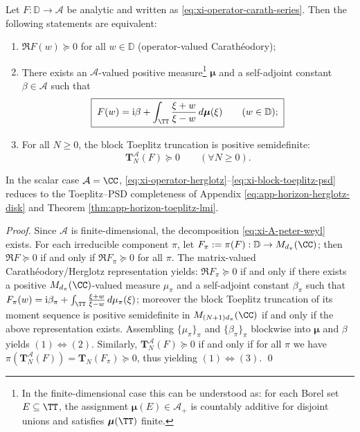 \begin{theorem}\label{thm:xi-operator-herglotz-toeplitz-completeness}
Let \(F:\mathbb{D}\to\mathcal{A}\) be analytic and written as \eqref{eq:xi-operator-carath-series}.
Then the following statements are equivalent:
\begin{enumerate}
  \item \(\Re F(w)\succeq 0\) for all \(w\in\mathbb{D}\) (operator-valued Carath\'eodory);
  \item There exists an \(\mathcal{A}\)-valued positive measure\footnote{In the finite-dimensional case this can be understood as: for each Borel set \(E\subseteq\TT\), the assignment \(\boldsymbol\mu(E)\in\mathcal{A}_+\) is countably additive for disjoint unions and satisfies \(\boldsymbol\mu(\TT)\) finite.} \(\boldsymbol\mu\) and a self-adjoint constant \(\beta\in\mathcal{A}\) such that
  \begin{equation}\label{eq:xi-operator-herglotz}
  \boxed{\;
  F(w)=\mathrm{i}\beta+\int_{\TT}\frac{\xi+w}{\xi-w}\,d\boldsymbol\mu(\xi)\qquad(w\in\mathbb{D});\;}
  \end{equation}
  \item For all \(N\ge 0\), the block Toeplitz truncation is positive semidefinite:
  \begin{equation}\label{eq:xi-block-toeplitz-psd}
  \boxed{\;\mathbf{T}^{\mathcal{A}}_N(F)\succeq 0\qquad(\forall N\ge 0).\;}
  \end{equation}
\end{enumerate}
In the scalar case \(\mathcal{A}=\CC\), \eqref{eq:xi-operator-herglotz}--\eqref{eq:xi-block-toeplitz-psd} reduces to the Toeplitz--PSD completeness of Appendix \eqref{eq:app-horizon-herglotz-disk} and Theorem \ref{thm:app-horizon-toeplitz-lmi}.
\end{theorem}

\begin{proof}
Since \(\mathcal{A}\) is finite-dimensional, the decomposition \eqref{eq:xi-A-peter-weyl} exists.
For each irreducible component \(\pi\), let \(F_\pi:=\pi(F):\mathbb{D}\to M_{d_\pi}(\CC)\); then
\(\Re F\succeq 0\) if and only if \(\Re F_\pi\succeq 0\) for all \(\pi\).
The matrix-valued Carath\'eodory/Herglotz representation yields: \(\Re F_\pi\succeq 0\) if and only if there exists a positive \(M_{d_\pi}(\CC)\)-valued measure \(\mu_\pi\) and a self-adjoint constant \(\beta_\pi\) such that
\(
F_\pi(w)=\mathrm{i}\beta_\pi+\int_{\TT}\frac{\xi+w}{\xi-w}\,d\mu_\pi(\xi)
\);
moreover the block Toeplitz truncation of its moment sequence is positive semidefinite in \(M_{(N+1)d_\pi}(\CC)\) if and only if the above representation exists.
Assembling \(\{\mu_\pi\}_{\pi}\) and \(\{\beta_\pi\}_{\pi}\) blockwise into \(\boldsymbol\mu\) and \(\beta\) yields \((1)\Leftrightarrow(2)\).
Similarly, \(\mathbf{T}^{\mathcal{A}}_N(F)\succeq 0\) if and only if for all \(\pi\) we have \(\pi(\mathbf{T}^{\mathcal{A}}_N(F))=\mathbf{T}_N(F_\pi)\succeq 0\), thus yielding \((1)\Leftrightarrow(3)\). \qed
\end{proof}

